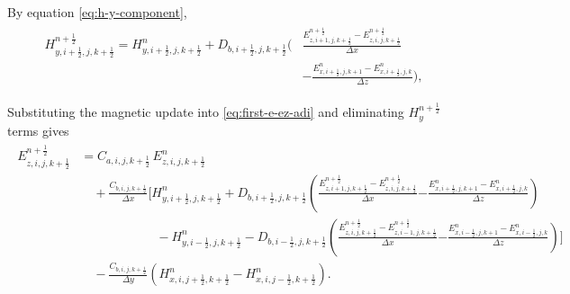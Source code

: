 \documentclass{article}
\numberwithin{equation}{section}
\numberwithin{figure}{section}
\begin{document}
By equation \eqref{eq:h-y-component},
\begin{align}
    \begin{split}
        H_{y,i+\tfrac12,j,k+\tfrac12}^{n+\frac12} = H_{y,i+\tfrac12,j,k+\tfrac12}^{n} + D_{b,i+\tfrac12,j,k+\tfrac12}\Big( & \frac{E_{z,i+1,j,k+\tfrac12}^{n+\frac12}-E_{z,i,j,k+\tfrac12}^{n+\frac12}}{\Delta x} \\
                                                                                                                           & - \frac{E_{x,i+\tfrac12,j,k+1}^{n}-E_{x,i+\tfrac12,j,k}^{n}}{\Delta z}\Big),
    \end{split}
\end{align}

Substituting the magnetic update into \eqref{eq:first-e-ez-adi} and eliminating $H_{y}^{n+\frac12}$ terms gives
\begin{align}
    \begin{split}
        E_{z,i,j,k+\tfrac12}^{n+\frac12} & = C_{a,i,j,k+\tfrac12}\,E_{z,i,j,k+\tfrac12}^{n}                                                                                                                                                                                                                                                           \\
                                         & \quad + \frac{C_{b,i,j,k+\tfrac12}}{\Delta x}\Bigg[H_{y,i+\tfrac12,j,k+\tfrac12}^{n} + D_{b,i+\tfrac12,j,k+\tfrac12}\left(\frac{E_{z,i+1,j,k+\tfrac12}^{n+\frac12}-E_{z,i,j,k+\tfrac12}^{n+\frac12}}{\Delta x}\right. \left. - \frac{E_{x,i+\tfrac12,j,k+1}^{n}-E_{x,i+\tfrac12,j,k}^{n}}{\Delta z}\right) \\
                                         & \qquad\qquad\qquad - H_{y,i-\tfrac12,j,k+\tfrac12}^{n} - D_{b,i-\tfrac12,j,k+\tfrac12}\left(\frac{E_{z,i,j,k+\tfrac12}^{n+\frac12}-E_{z,i-1,j,k+\tfrac12}^{n+\frac12}}{\Delta x}\right. \left. - \frac{E_{x,i-\tfrac12,j,k+1}^{n}-E_{x,i-\tfrac12,j,k}^{n}}{\Delta z}\right)\Bigg]                         \\
                                         & \quad - \frac{C_{b,i,j,k+\tfrac12}}{\Delta y}\left(H_{x,i,j+\tfrac12,k+\tfrac12}^{n}-H_{x,i,j-\tfrac12,k+\tfrac12}^{n}\right).
    \end{split}
\end{align}
\end{document}
